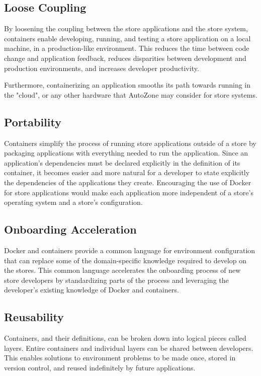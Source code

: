 \documentclass{article}
\begin{document}
\subsection{Loose Coupling}
By loosening the coupling between the store applications and the store system, containers enable developing, running, and testing a store application on a local machine, in a production-like environment. This reduces the time between code change and application feedback, reduces disparities between development and production environments, and increases developer productivity.

Furthermore, containerizing an application smooths its path towards running in the "cloud", or any other hardware that AutoZone may consider for store systems.

\subsection{Portability}
Containers simplify the process of running store applications outside of a store by packaging applications with everything needed to run the application. Since an application's dependencies must be declared explicitly in the definition of its container, it becomes easier and more natural for a developer to state explicitly the dependencies of the applications they create. Encouraging the use of Docker for store applications would make each application more independent of a store's operating system and a store's configuration.

\subsection{Onboarding Acceleration}
Docker and containers provide a common language for environment configuration that can replace some of the domain-specific knowledge required to develop on the stores. This common language accelerates the onboarding process of new store developers by standardizing parts of the process and leveraging the developer's existing knowledge of Docker and containers.

\subsection{Reusability}
Containers, and their definitions, can be broken down into logical pieces called layers. Entire containers and individual layers can be shared between developers. This enables solutions to environment problems to be made once, stored in version control, and reused indefinitely by future applications.
\end{document}
